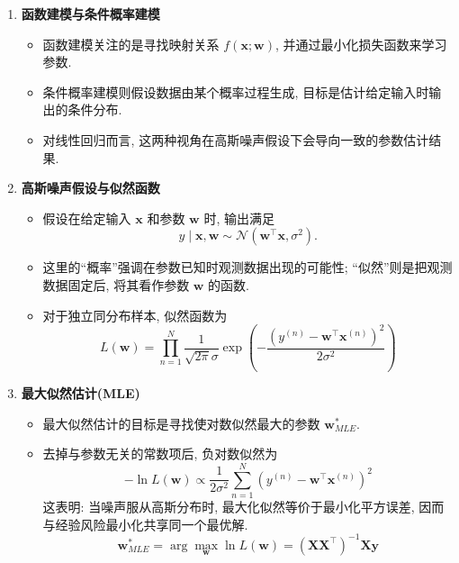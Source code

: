 \documentclass{../nndlcourse}
\begin{document}
\begin{enumerate}
  \item \textbf{函数建模与条件概率建模}
    \begin{itemize}
    \item 函数建模关注的是寻找映射关系 $f(\boldsymbol{x}; \boldsymbol{w})$, 并通过最小化损失函数来学习参数.
    \item 条件概率建模则假设数据由某个概率过程生成, 目标是估计给定输入时输出的条件分布.
    \item 对线性回归而言, 这两种视角在高斯噪声假设下会导向一致的参数估计结果.
  \end{itemize}

  \item \textbf{高斯噪声假设与似然函数}
  \begin{itemize}
    \item 假设在给定输入 $\boldsymbol{x}$ 和参数 $\boldsymbol{w}$ 时, 输出满足
    \begin{equation*}
    y \mid \boldsymbol{x}, \boldsymbol{w} \sim \mathcal{N}(\boldsymbol{w}^{\top} \boldsymbol{x}, \sigma^2).
    \end{equation*}
    \item 这里的“概率”强调在参数已知时观测数据出现的可能性; “似然”则是把观测数据固定后, 将其看作参数 $\boldsymbol{w}$ 的函数.
    \item 对于独立同分布样本, 似然函数为
        \begin{equation*}
        L(\boldsymbol{w}) = \prod_{n=1}^N \frac{1}{\sqrt{2\pi}\sigma} \exp\left(-\frac{(y^{(n)} - \boldsymbol{w}^\top \boldsymbol{x}^{(n)})^2}{2\sigma^2}\right)
    \end{equation*}
    \end{itemize}

    \item \textbf{最大似然估计(MLE)}
    \begin{itemize}
    \item 最大似然估计的目标是寻找使对数似然最大的参数 $\boldsymbol{w}_{MLE}^*$.
    \item 去掉与参数无关的常数项后, 负对数似然为
        \begin{equation*}
        -\ln L(\boldsymbol{w}) \propto \frac{1}{2\sigma^2} \sum_{n=1}^N \left(y^{(n)} - \boldsymbol{w}^\top \boldsymbol{x}^{(n)}\right)^2 
        \end{equation*}
    这表明: 当噪声服从高斯分布时, 最大化似然等价于最小化平方误差, 因而与经验风险最小化共享同一个最优解.
        \begin{equation*}
        \boldsymbol{w}^*_{MLE} = \arg\max_{\boldsymbol{w}} \ln L(\boldsymbol{w}) = (\boldsymbol{X}\boldsymbol{X}^\top)^{-1}\boldsymbol{X}\boldsymbol{y}
        \end{equation*}
    \end{itemize}


\end{enumerate}
\end{document}
